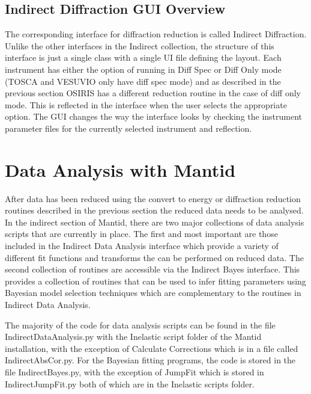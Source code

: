 \documentclass[paper=a4, fontsize=11pt]{scrartcl}	%
\numberwithin{equation}{section}															%
\numberwithin{figure}{section}																%
\numberwithin{table}{section}																%
\begin{document}
\subsection{Indirect Diffraction GUI Overview}
The corresponding interface for diffraction reduction is called Indirect Diffraction. Unlike the other interfaces in the Indirect collection, the structure of this interface is just a single class with a single UI file defining the layout. Each instrument has either the option of running in Diff Spec or Diff Only mode (TOSCA and VESUVIO only have diff spec mode) and as described in the previous section OSIRIS has a different reduction routine in the case of diff only mode. This is reflected in the interface when the user selects the appropriate option. The GUI changes the way the interface looks by checking the instrument parameter files for the currently selected instrument and reflection.

\section{Data Analysis with Mantid}
After data has been reduced using the convert to energy or diffraction reduction routines described in the previous section the reduced data needs to be analysed. In the indirect section of Mantid, there are two major collections of data analysis scripts that are currently in place. The first  and most important are those included in the Indirect Data Analysis interface which provide a variety of different fit functions and transforms the can be performed on reduced data. The second collection of routines are accessible via the Indirect Bayes interface. This provides a collection of routines that can be used to infer fitting parameters using Bayesian model selection techniques which are complementary to the routines in Indirect Data Analysis.

The majority of the code for data analysis scripts can be found in the file IndirectDataAnalysis.py with the Inelastic script folder of the Mantid installation, with the exception of Calculate Corrections which is in a file called IndirectAbsCor.py. For the Bayesian fitting programs, the code is stored in the file IndirectBayes.py, with the exception of JumpFit which is stored in IndirectJumpFit.py both of which are in the Inelastic scripts folder.
\end{document}
